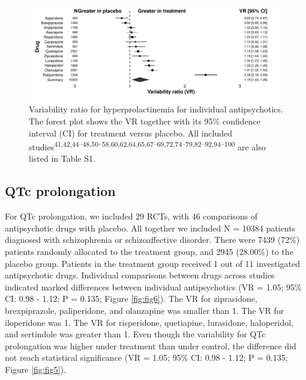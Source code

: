 \documentclass[
  9pt,
  english,
  ,jou,floatsintext]{apa6}
\begin{document}
\begin{figure}
\centering
\includegraphics{../output/figures/prolactinsd_fig2.pdf}
\caption{\label{fig:fig4}Variability ratio for hyperprolactinemia for individual
antipsychotics. The forest plot shows the VR together with its 95\%
confidence interval (CI) for treatment versus placebo. All included studies\textsuperscript{41,42,44--48,50--58,60,62,64,65,67--69,72,74--79,82--92,94--100}
are also listed in Table S1.}
\end{figure}

\hypertarget{qtc-prolongation}{%
\subsection{QTc prolongation}\label{qtc-prolongation}}

For QTc prolongation, we included 29 RCTs, with 46
comparisons of antipsychotic drugs with placebo. All together we
included N = 10384 patients diagnosed with schizophrenia or
schizoaffective disorder. There were 7439
(72\%) patients randomly allocated to
the treatment group, and 2945
(28.00\%) to the placebo group. Patients
in the treatment group received 1 out of 11 investigated antipsychotic
drugs. Individual comparisons between drugs across studies indicated
marked differences between individual antipsychotics
(VR = 1.05; 95\% CI: 0.98 - 1.12; P = 0.135; Figure \ref{fig:fig6}).
The VR for ziprasidone, brexpiprazole, paliperidone, and olanzapine was
smaller than 1. The VR for iloperidone was 1. The VR for risperidone,
quetiapine, lurasidone, haloperidol, and sertindole was greater than 1.
Even though the variability for QTc prolongation was higher under
treatment than under control, the difference did not reach statistical
significance (VR = 1.05; 95\% CI: 0.98 - 1.12; P = 0.135; Figure \ref{fig:fig5}).
\end{document}
